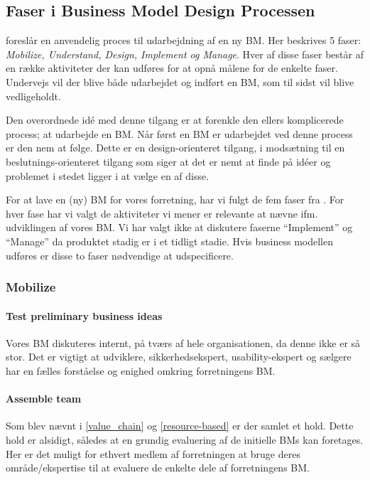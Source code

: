 \subsection{Faser i Business Model Design Processen}
\citet[pp. 244-259]{osterwalder2009business} foreslår en anvendelig proces til udarbejdning af en ny BM.
Her beskrives 5 faser: \emph{Mobilize, Understand, Design, Implement og Manage}.
Hver af disse faser består af en række aktiviteter der kan udføres for at opnå målene for de enkelte faser.
Undervejs vil der blive både udarbejdet og indført en BM, som til sidst vil blive vedligeholdt.

Den overordnede idé med denne tilgang er at forenkle den ellers komplicerede process; at udarbejde en BM.
Når først en BM er udarbejdet ved denne process er den nem at følge.
Dette er en design-orienteret tilgang, i modsætning til en beslutnings-orienteret tilgang som siger at det er nemt at finde på idéer og problemet i stedet ligger i at vælge en af disse.

For at lave en (ny) BM for vores forretning, har vi fulgt de fem faser fra \citet[pp. 244-259]{osterwalder2009business}.
For hver fase har vi valgt de aktiviteter vi mener er relevante at nævne ifm. udviklingen af vores BM.
Vi har valgt ikke at diskutere faserne ``Implement'' og ``Manage'' da produktet stadig er i et tidligt stadie.
Hvis business modellen udføres er disse to faser nødvendige at udspecificere.

\subsubsection{Mobilize}
\paragraph{Test preliminary business ideas}
Vores BM diskuteres internt, på tværs af hele organisationen, da denne ikke er så stor.
Det er vigtigt at udviklere, sikkerhedsekspert, usability-ekspert og sælgere har en fælles forståelse og enighed omkring forretningens BM.

\paragraph{Assemble team}
Som blev nævnt i \cref{value_chain} og \cref{resource-based} er der samlet et hold.
Dette hold er alsidigt, således at en grundig evaluering af de initielle BMs kan foretages.
Her er det muligt for ethvert medlem af forretningen at bruge deres område/ekspertise til at evaluere de enkelte dele af forretningens BM.

